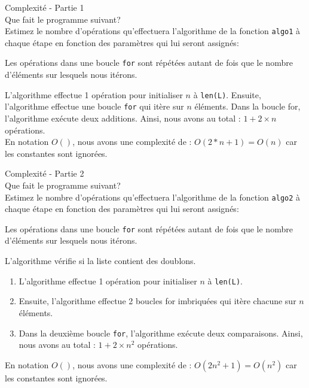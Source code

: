 \begin{Exercice}[5 minutes] Complexité - Partie 1\\
    Que fait le programme suivant? \\
    Estimez le nombre d'opérations qu'effectuera l'algorithme de la fonction \lstinline{algo1} à chaque étape en fonction des paramètres qui lui seront assignés:
    
\begin{conseil}
   Les opérations dans une boucle \lstinline{for} sont répétées autant de fois que le 
   nombre d'éléments sur lesquels nous itérons.
\end{conseil}
    
\begin{solution}
L'algorithme effectue 1 opération pour initialiser $n$ à \lstinline{len(L)}. Ensuite, l'algorithme
effectue une boucle \lstinline{for} qui itère sur $n$ éléments. Dans la boucle for, l'algorithme exécute deux additions.
Ainsi, nous avons au total : $1 + 2\times n$ opérations. \\
En notation $O()$, nous avons une complexité de : $O(2*n + 1) = O(n)$ car les constantes sont ignorées.    
\end{solution}

\end{Exercice}

\begin{Exercice}[5 minutes] Complexité - Partie 2\\
    Que fait le programme suivant? \\
    Estimez le nombre d'opérations qu'effectuera l'algorithme de la fonction \lstinline{algo2} à chaque étape en fonction des paramètres qui lui seront assignés:
    
\begin{conseil}
   Les opérations dans une boucle \lstinline{for} sont répétées autant de fois que le 
   nombre d'éléments sur lesquels nous itérons.
\end{conseil}
    
\begin{solution}
    L'algorithme vérifie si la liste contient des doublons.
    \begin{enumerate}
        \item L'algorithme effectue 1 opération pour initialiser $n$ à \lstinline{len(L)}. 
        \item Ensuite, l'algorithme effectue 2 boucles for imbriquées qui itère chacune sur $n$ éléments. 
        \item Dans la deuxième boucle \lstinline{for}, l'algorithme exécute deux comparaisons. 
        Ainsi, nous avons au total : $1 + 2 \times n^2$ opérations. \\
    \end{enumerate}
    En notation $O()$, nous avons une complexité de : $O(2n^2 + 1) = O(n^2)$ car les constantes sont ignorées. 
       
\end{solution}

\end{Exercice}

